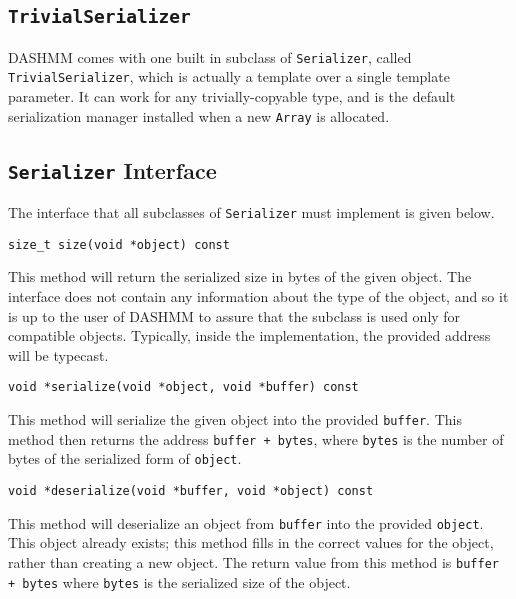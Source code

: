 \subsection{\texttt{TrivialSerializer}}

DASHMM comes with one built in subclass of \texttt{Serializer}, called
\texttt{TrivialSerializer}, which is actually a template over a single
template parameter. It can work for any trivially-copyable type, and is the
default serialization manager installed when a new \texttt{Array} is
allocated.

\subsection{\texttt{Serializer} Interface}

The interface that all subclasses of \texttt{Serializer} must implement is
given below.

\begin{lstlisting}
size_t size(void *object) const
\end{lstlisting}

\noindent This method will return the serialized size in bytes of the given
object. The interface does not contain any information about the type of the
object, and so it is up to the user of DASHMM to assure that the subclass is
used only for compatible objects. Typically, inside the implementation, the
provided address will be typecast.

\begin{lstlisting}
void *serialize(void *object, void *buffer) const
\end{lstlisting}

\noindent This method will serialize the given object into the provided 
\texttt{buffer}. This method then returns the address \texttt{buffer + bytes},
where \texttt{bytes} is the number of bytes of the serialized form of 
\texttt{object}.

\begin{lstlisting}
void *deserialize(void *buffer, void *object) const
\end{lstlisting}

\noindent This method will deserialize an object from \texttt{buffer} into
the provided \texttt{object}. This object already exists; this method fills
in the correct values for the object, rather than creating a new object.
The return value from this method is \texttt{buffer + bytes} where 
\texttt{bytes} is the serialized size of the object.

